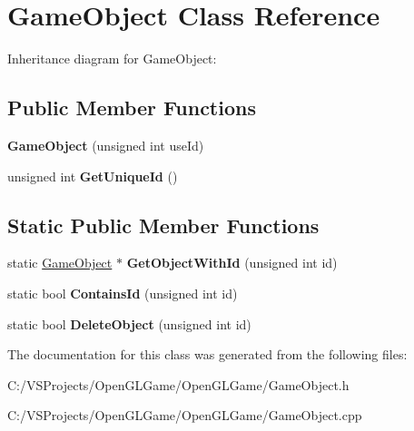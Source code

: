 \hypertarget{class_game_object}{\section{Game\-Object Class Reference}
\label{class_game_object}
}


Inheritance diagram for Game\-Object\-:
\subsection*{Public Member Functions}
\begin{DoxyCompactItemize}
\item 
\hypertarget{class_game_object_a45eacd62544ae2d36bba827b32749050}{{\bfseries Game\-Object} (unsigned int use\-Id)}\label{class_game_object_a45eacd62544ae2d36bba827b32749050}

\item 
\hypertarget{class_game_object_aa1e388c2b066aabfd7bb19668c2eea28}{unsigned int {\bfseries Get\-Unique\-Id} ()}\label{class_game_object_aa1e388c2b066aabfd7bb19668c2eea28}

\end{DoxyCompactItemize}
\subsection*{Static Public Member Functions}
\begin{DoxyCompactItemize}
\item 
\hypertarget{class_game_object_a8d4311b0293f956710cf41a56eb63f88}{static \hyperlink{class_game_object}{Game\-Object} $\ast$ {\bfseries Get\-Object\-With\-Id} (unsigned int id)}\label{class_game_object_a8d4311b0293f956710cf41a56eb63f88}

\item 
\hypertarget{class_game_object_a78b3da60c718ef88a7a063da3a18ca40}{static bool {\bfseries Contains\-Id} (unsigned int id)}\label{class_game_object_a78b3da60c718ef88a7a063da3a18ca40}

\item 
\hypertarget{class_game_object_a2b0942754e8115873d8d4481bda9e4af}{static bool {\bfseries Delete\-Object} (unsigned int id)}\label{class_game_object_a2b0942754e8115873d8d4481bda9e4af}

\end{DoxyCompactItemize}


The documentation for this class was generated from the following files\-:\begin{DoxyCompactItemize}
\item 
C\-:/\-V\-S\-Projects/\-Open\-G\-L\-Game/\-Open\-G\-L\-Game/Game\-Object.\-h\item 
C\-:/\-V\-S\-Projects/\-Open\-G\-L\-Game/\-Open\-G\-L\-Game/Game\-Object.\-cpp\end{DoxyCompactItemize}
